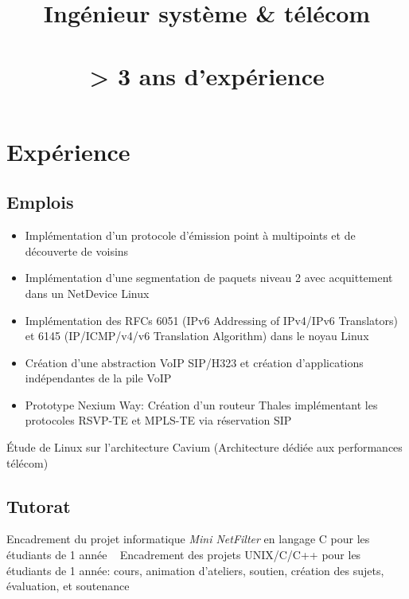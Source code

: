 \documentclass[11pt, a4paper]{moderncv}
\title{\textbf{Ingénieur système \& télécom} \\\\ \Large{> 3 ans d'expérience}}
\begin{document}
\maketitle

\section{Expérience}
\subsection{Emplois}
{
  \begin{itemize}
    \renewcommand{\labelitemi}{$\bullet$  }
    \item Implémentation d'un protocole d'émission point \`a multipoints et de découverte de voisins
    \item Implémentation d'une segmentation de paquets niveau 2 avec acquittement dans un NetDevice
	Linux
    \item Implémentation des RFCs 6051 (IPv6 Addressing of IPv4/IPv6 Translators) et 6145 (IP/ICMP/v4/v6
	Translation Algorithm) dans le noyau Linux
    \item Création d'une abstraction VoIP SIP/H323 et création d'applications indépendantes de la
	pile VoIP
    \item Prototype Nexium Way: Création d'un routeur Thales implémentant les protocoles RSVP-TE et
	MPLS-TE via réservation SIP
  \end{itemize}
}														%
{
  Étude de Linux sur l'architecture Cavium (Architecture dédiée aux performances télécom)
}														%

\subsection{Tutorat}
	      {Encadrement du projet informatique \textit{Mini NetFilter} en langage C pour les étudiants
		de 1\iere{} année}		 								%
	      {Encadrement des projets UNIX/C/C++ pour les étudiants de 1\iere{} année: cours,
		animation d'ateliers, soutien, création des sujets, évaluation, et soutenance}			%
\end{document}
